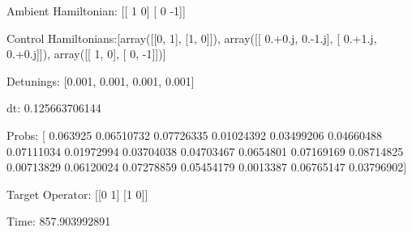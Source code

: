 \documentclass{article}
\begin{document}
    

\newpage

Ambient Hamiltonian: [[ 1  0]
 [ 0 -1]]

Control Hamiltonians:[array([[0, 1],
       [1, 0]]), array([[ 0.+0.j,  0.-1.j],
       [ 0.+1.j,  0.+0.j]]), array([[ 1,  0],
       [ 0, -1]])]

Detunings: [0.001, 0.001, 0.001, 0.001]

 dt: 0.125663706144

Probs: [ 0.063925    0.06510732  0.07726335  0.01024392  0.03499206  0.04660488
  0.07111034  0.01972994  0.03704038  0.04703467  0.0654801   0.07169169
  0.08714825  0.00713829  0.06120024  0.07278859  0.05454179  0.0013387
  0.06765147  0.03796902]

Target Operator: [[0 1]
 [1 0]]

Time: 857.903992891
\end{document}
